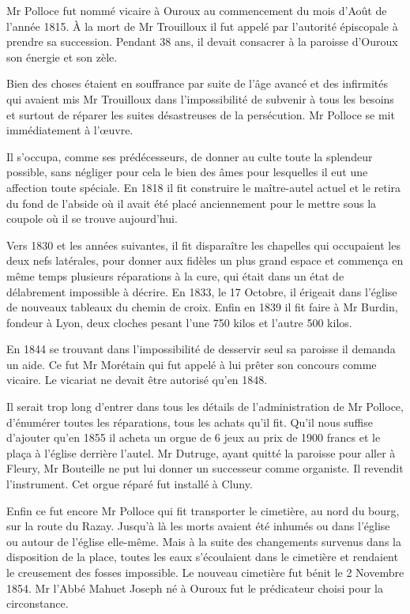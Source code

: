 Mr Polloce fut nommé vicaire à Ouroux au commencement du mois d'Août de l'année 1815. À la mort de Mr Trouilloux il fut appelé par l'autorité épiscopale à prendre sa succession. Pendant 38 ans, il devait consacrer à la paroisse d'Ouroux son énergie et son zèle.

Bien des choses étaient en souffrance par suite de l'âge avancé et des infirmités qui avaient mis Mr Trouilloux dans l'impossibilité de subvenir à tous les besoins et surtout de réparer les suites désastreuses de la persécution. Mr Polloce se mit immédiatement à l'œuvre.

Il s'occupa, comme ses prédécesseurs, de donner au culte toute la splendeur possible, sans négliger pour cela le bien des âmes pour lesquelles il eut une affection toute spéciale. En 1818 il fit construire le maître-autel actuel et le retira du fond de l'abside où il avait été placé anciennement pour le mettre sous la coupole où il se trouve aujourd'hui.

Vers 1830 et les années suivantes, il fit disparaître les chapelles qui occupaient les deux nefs latérales, pour donner aux fidèles un plus grand espace et commença en même temps plusieurs réparations à la cure, qui était dans un état de délabrement impossible à décrire. En 1833, le 17 Octobre, il érigeait dans l'église de nouveaux tableaux du chemin de croix. Enfin en 1839 il fit faire à Mr Burdin, fondeur à Lyon, deux cloches pesant l'une 750 kilos et l'autre 500 kilos.

En 1844 se trouvant dans l'impossibilité de desservir seul sa paroisse il demanda un aide. Ce fut Mr Morétain qui fut appelé à lui prêter son concours comme vicaire. Le vicariat ne devait être autorisé qu'en 1848.

Il serait trop long d'entrer dans tous les détails de l'administration de Mr Polloce, d'énumérer toutes les réparations, tous les achats qu'il fit. Qu'il nous suffise d'ajouter qu'en 1855 il acheta un orgue de 6 jeux au prix de 1900 francs et le plaça à l'église derrière l'autel. Mr Dutruge, ayant quitté la paroisse pour aller à Fleury, Mr Bouteille ne put lui donner un successeur comme organiste. Il revendit l'instrument. Cet orgue réparé fut installé à Cluny.

Enfin ce fut encore Mr Polloce qui fit transporter le cimetière, au nord du bourg, sur la route du Razay. Jusqu'à là les morts avaient été inhumés ou dans l'église ou autour de l'église elle-même. Mais à la suite des changements survenus dans la disposition de la place, toutes les eaux s'écoulaient dans le cimetière et rendaient le creusement des fosses impossible. Le nouveau cimetière fut bénit le 2 Novembre 1854. Mr l'Abbé Mahuet Joseph né à Ouroux fut le prédicateur choisi pour la circonstance.

